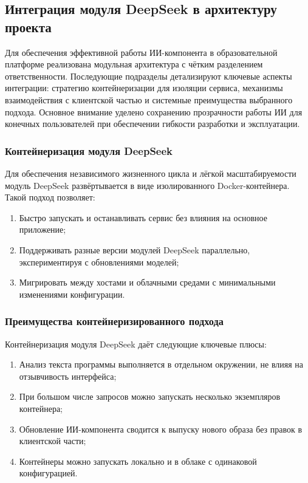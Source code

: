 \subsection{Интеграция модуля DeepSeek в архитектуру проекта}

Для обеспечения эффективной работы ИИ-компонента в образовательной платформе реализована модульная архитектура с чётким разделением ответственности. Последующие подразделы детализируют ключевые аспекты интеграции: стратегию контейнеризации для изоляции сервиса, механизмы взаимодействия с клиентской частью и системные преимущества выбранного подхода. Основное внимание уделено сохранению прозрачности работы ИИ для конечных пользователей при обеспечении гибкости разработки и эксплуатации.

\subsubsection{Контейнеризация модуля DeepSeek}
Для обеспечения независимого жизненного цикла и лёгкой масштабируемости модуль DeepSeek развёртывается в виде изолированного Docker-контейнера. Такой подход позволяет:

\begin{enumerate}
  \item Быстро запускать и останавливать сервис без влияния на основное приложение;
  \item Поддерживать разные версии модулей DeepSeek параллельно, экспериментируя с обновлениями моделей;
  \item Мигрировать между хостами и облачными средами с минимальными изменениями конфигурации.
\end{enumerate}

\subsubsection{Преимущества контейнеризированного подхода}
Контейнеризация модуля DeepSeek даёт следующие ключевые плюсы:
\begin{enumerate}
  \item Анализ текста программы выполняется в отдельном окружении, не влияя на отзывчивость интерфейса;
  \item При большом числе запросов можно запускать несколько экземпляров контейнера;
  \item Обновление ИИ-компонента сводится к выпуску нового образа без правок в клиентской части;
  \item Контейнеры можно запускать локально и в облаке с одинаковой конфигурацией.
\end{enumerate}

